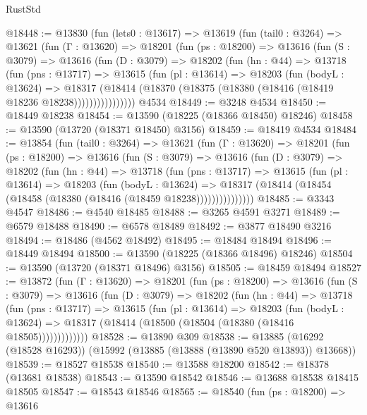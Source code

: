 \begin{lexlean}{RustStd}
\begin{coremodule}
@18448 := @13830
    (fun (lets0 : @13617) =>
    @13619
      (fun (tail0 : @3264) =>
      @13621
        (fun (Γ : @13620) =>
        @18201
          (fun (ps : @18200) =>
          @13616
            (fun (S : @3079) =>
            @13616
              (fun (D : @3079) =>
              @18202
                (fun (hn : @44) =>
                @13718
                  (fun (pns : @13717) =>
                  @13615
                    (fun (pl : @13614) =>
                    @18203
                      (fun (bodyL : @13624) =>
                      @18317
                        (@18414
                          (@18370 (@18375 (@18380 (@18416 (@18419 @18236 @18238))))))))))))))))
    @4534
@18449 := @3248 @4534
@18450 := @18449 @18238
@18454 := @13590 (@18225 (@18366 @18450) @18246)
@18458 := @13590 (@13720 (@18371 @18450) @3156)
@18459 := @18419 @4534
@18484 := @13854
    (fun (tail0 : @3264) =>
    @13621
      (fun (Γ : @13620) =>
      @18201
        (fun (ps : @18200) =>
        @13616
          (fun (S : @3079) =>
          @13616
            (fun (D : @3079) =>
            @18202
              (fun (hn : @44) =>
              @13718
                (fun (pns : @13717) =>
                @13615
                  (fun (pl : @13614) =>
                  @18203
                    (fun (bodyL : @13624) =>
                    @18317 (@18414 (@18454 (@18458 (@18380 (@18416 (@18459 @18238)))))))))))))))
@18485 := @3343 @4547
@18486 := @4540 @18485
@18488 := @3265 @4591 @3271
@18489 := @6579 @18488
@18490 := @6578 @18489
@18492 := @3877 @18490 @3216
@18494 := @18486 (@4562 @18492)
@18495 := @18484 @18494
@18496 := @18449 @18494
@18500 := @13590 (@18225 (@18366 @18496) @18246)
@18504 := @13590 (@13720 (@18371 @18496) @3156)
@18505 := @18459 @18494
@18527 := @13872
    (fun (Γ : @13620) =>
    @18201
      (fun (ps : @18200) =>
      @13616
        (fun (S : @3079) =>
        @13616
          (fun (D : @3079) =>
          @18202
            (fun (hn : @44) =>
            @13718
              (fun (pns : @13717) =>
              @13615
                (fun (pl : @13614) =>
                @18203
                  (fun (bodyL : @13624) =>
                  @18317 (@18414 (@18500 (@18504 (@18380 (@18416 @18505)))))))))))))
@18528 := @13890 @309
@18538 := @13885 (@16292 (@18528 @16293)) (@15992 (@13885 (@13888 (@13890 @520 @13893)) @13668))
@18539 := @18527 @18538
@18540 := @13588 @18200
@18542 := @18378 (@13681 @18538)
@18543 := @13590 @18542
@18546 := @13688 @18538 @18415 @18505
@18547 := @18543 @18546
@18565 := @18540
    (fun (ps : @18200) =>
    @13616

\end{coremodule}
\end{lexlean}

